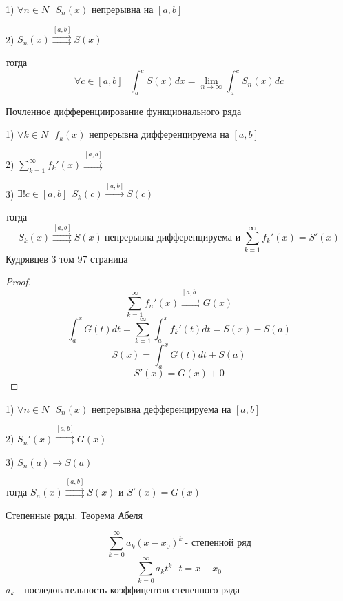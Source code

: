 \begin{theorem}
  1) $\forall n \in N ~~~ S_n(x)$ непрерывна на $[a,b]$

  2) $S_n(x) \stackrel{[a, b]}{\rightrightarrows} S(x)$

  тогда
  $$
  \forall c \in [a,b] ~~~ \int_a^c S(x)dx = \lim_{n \to \infty}
  \int_a^c S_n(x)dc
  $$
\end{theorem}

\begin{title}[\Large]
  Почленное дифференциирование функционального ряда
\end{title}

\begin{theorem}
  1) $\forall k \in N ~~~ f_k(x)$ непрерывна дифференцируема на $[a,b]$

  2) $\sum_{k=1}^{\infty} f_k'(x) \stackrel{[a, b]}{\rightrightarrows}$

  3) $\exists! c \in [a,b] ~~ S_k(c) \stackrel{[a,b]}{\rightarrow} S(c)$

  тогда
  $$
  S_k(x) \stackrel{[a, b]}{\rightrightarrows} S(x) ~
  \text{непрерывна дифференцируема и} ~ \sum_{k=1}^{\infty} f_k'(x) = S'(x)
  $$
  Кудрявцев 3 том 97 страница
\end{theorem}

\begin{proof}
  $$
  \sum_{k=1}^{\infty} f_n'(x) \stackrel{[a,b]}{\rightrightarrows} G(x)
  $$
  $$
  \int_a^x G(t)dt = \sum_{k=1}^{\infty} \int_a^x f_k'(t) dt = S(x) - S(a)
  $$
  $$
  S(x) = \int_a^x G(t)dt + S(a)
  $$
  $$
  S'(x) = G(x) + 0
  $$
\end{proof}

\begin{theorem}
  1) $\forall n \in N ~~~ S_n(x)$ непрерывна дефференцируема на $[a,b]$

  2) $S_n'(x) \stackrel{[a,b]}{\rightrightarrows} G(x)$

  3) $S_n(a) \to S(a)$

  тогда $S_n(x) \stackrel{[a,b]}{\rightrightarrows} S(x)$ и $S'(x) = G(x)$
\end{theorem}

\begin{title}[\Large]
  Степенные ряды. Теорема Абеля
\end{title}

\begin{define}
  $$
  \sum_{k=0}^{\infty} a_k (x-x_0)^k ~ \text{- степенной ряд}
  $$
  $$
  \sum_{k=0}^{\infty} a_k t^k ~~~ t = x - x_0
  $$
  $a_k$ - последовательность коэффицентов степенного ряда
\end{define}

